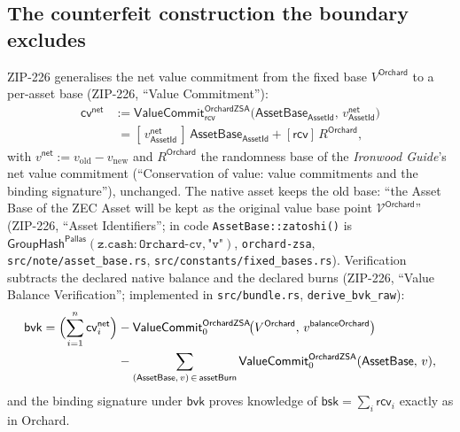 \documentclass[11pt,a4paper]{article}
\theoremstyle{definition}
\newcommand{\cvsym}{\mathsf{cv}}
\newcommand{\Pallas}{\ensuremath{\mathsf{Pallas}}}
\newcommand{\GroupHash}{\ensuremath{\mathsf{GroupHash}}}
\newcommand{\rcv}{\ensuremath{\mathsf{rcv}}}
\begin{document}
\subsection{The counterfeit construction the boundary excludes}
\label{sec:zsa-split-attack}

ZIP-226 generalises the net value commitment from the fixed base
$V^{\mathsf{Orchard}}$ to a per-asset base (ZIP-226, ``Value Commitment''):
\begin{equation}\label{eq:zsa-cvnet}
\begin{split}
\cvsym^{\mathsf{net}} &:=
\mathsf{ValueCommit}^{\mathsf{OrchardZSA}}_{\rcv}\!\bigl(
\mathsf{AssetBase}_{\mathsf{AssetId}},\,
v^{\mathsf{net}}_{\mathsf{AssetId}}\bigr) \\
&\;= [\,v^{\mathsf{net}}_{\mathsf{AssetId}}\,]\,
\mathsf{AssetBase}_{\mathsf{AssetId}} + [\rcv]\,R^{\mathsf{Orchard}},
\end{split}
\end{equation}
with $v^{\mathsf{net}} := v_{\mathrm{old}} - v_{\mathrm{new}}$ and
$R^{\mathsf{Orchard}}$ the randomness base of the \emph{Ironwood Guide}'s
net value commitment (``Conservation of value: value commitments and the
binding signature''), unchanged. The native asset keeps the old base:
``the Asset Base of the ZEC Asset will be kept as the original value base
point $\mathcal{V}^{\mathsf{Orchard}}$'' (ZIP-226, ``Asset Identifiers'';
in code \texttt{AssetBase::zatoshi()} is
$\GroupHash^{\Pallas}(\mathtt{z.cash:Orchard\text{-}cv}, \texttt{"v"})$,
\texttt{orchard-zsa}, \texttt{src/note/asset\_base.rs},
\texttt{src/constants/fixed\_bases.rs}). Verification subtracts the
declared native balance and the declared burns (ZIP-226, ``Value Balance
Verification''; implemented in \texttt{src/bundle.rs},
\texttt{derive\_bvk\_raw}):
\begin{equation}\label{eq:zsa-bvk}
\begin{split}
\mathsf{bvk} = \Bigl(\sum_{i=1}^{n} \cvsym^{\mathsf{net}}_{i}\Bigr)
&- \mathsf{ValueCommit}^{\mathsf{OrchardZSA}}_{0}\!\bigl(
V^{\mathsf{Orchard}},\, v^{\mathsf{balanceOrchard}}\bigr) \\
&- \sum_{(\mathsf{AssetBase},\, v)\, \in\, \mathsf{assetBurn}}
\mathsf{ValueCommit}^{\mathsf{OrchardZSA}}_{0}(\mathsf{AssetBase},\, v),
\end{split}
\end{equation}
and the binding signature under $\mathsf{bvk}$ proves knowledge of
$\mathsf{bsk} = \sum_i \rcv_i$ exactly as in Orchard.
\end{document}
